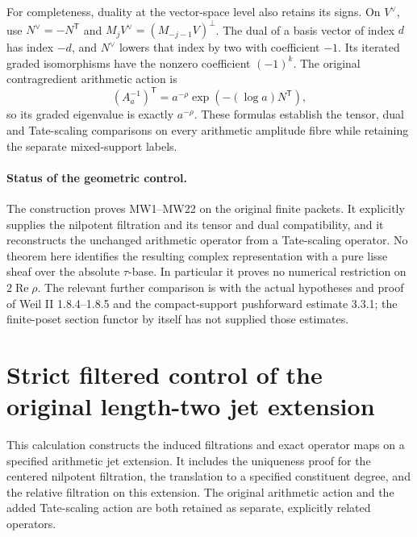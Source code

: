\documentclass[11pt,a4paper]{article}
\begin{document}
For completeness, duality at the vector-space level also retains
its signs. On \(V^\vee\), use \(N^\vee=-N^{\mathsf T}\) and
\(M_jV^\vee=(M_{-j-1}V)^\perp\). The dual of a basis vector of
index \(d\) has index \(-d\), and \(N^\vee\) lowers that index
by two with coefficient \(-1\). Its iterated graded isomorphisms
have the nonzero coefficient \((-1)^k\).
The original contragredient arithmetic action is
\[
 (A_a^{-1})^{\mathsf T}
       =a^{-\rho}\exp(-(\log a)N^{\mathsf T}),
 \tag{MW22}
\]
so its graded eigenvalue is exactly \(a^{-\rho}\).
These formulas establish the tensor, dual and Tate-scaling
comparisons on every arithmetic amplitude fibre while retaining
the separate mixed-support labels.

\paragraph{Status of the geometric control.}
The construction proves MW1--MW22 on the original finite packets.
It explicitly supplies the nilpotent filtration and its tensor
and dual compatibility, and it reconstructs the unchanged arithmetic
operator from a Tate-scaling operator. No theorem here identifies
the resulting complex representation with a pure lisse sheaf over
the absolute \(\tau\)-base. In particular it proves no numerical
restriction on \(2\operatorname{Re}\rho\). The relevant further
comparison is with the actual hypotheses and proof of Weil II
1.8.4--1.8.5 and the compact-support pushforward estimate 3.3.1;
the finite-poset section functor by itself has not supplied those
estimates.

\clearpage

\section{Strict filtered control of the original length-two jet extension}
\label{sec:tau-mixed-relative-extension-control}

This calculation constructs the induced filtrations and exact operator maps
on a specified arithmetic jet extension. It includes the uniqueness proof
for the centered nilpotent filtration, the translation to a specified
constituent degree, and the relative filtration on this extension.
The original arithmetic action and the added Tate-scaling action are both
retained as separate, explicitly related operators.
\end{document}
